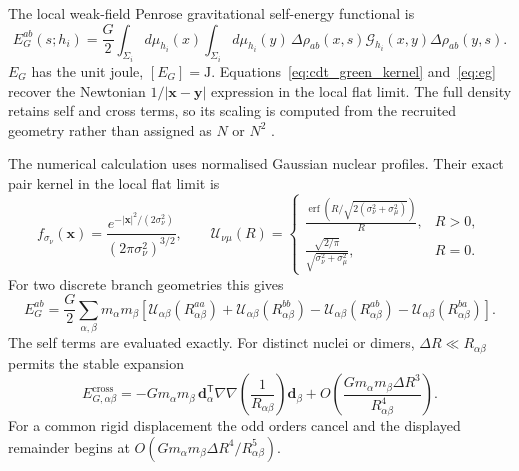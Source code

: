 The local weak-field Penrose gravitational self-energy functional is
\begin{equation}
  E_G^{ab}(s;h_i)=
  \frac{G}{2}
  \int_{\Sigma_i}d\mu_{h_i}(x)
  \int_{\Sigma_i}d\mu_{h_i}(y)\,
  \Delta\rho_{ab}(x,s)\mathcal G_{h_i}(x,y)\Delta\rho_{ab}(y,s).
  \label{eq:eg}
\end{equation}
\noindent $E_G$ has the unit joule, $[E_G]=\mathrm J$.
Equations~\eqref{eq:cdt_green_kernel}
and~\eqref{eq:eg} recover the Newtonian $1/|\mathbf x-\mathbf y|$ expression in the
local flat limit. The full density retains self and cross terms, so its scaling is
computed from the recruited geometry rather than assigned as $N$ or $N^2$
\citep{hameroff2014,figurato2024,tomaz2024}.

The numerical calculation uses normalised Gaussian nuclear profiles. Their exact
pair kernel in the local flat limit is
\begin{equation}
  f_{\sigma_\nu}(\mathbf x)=
  \frac{e^{-|\mathbf x|^2/(2\sigma_\nu^2)}}{(2\pi\sigma_\nu^2)^{3/2}},
  \qquad
  \mathcal U_{\nu\mu}(R)=
  \begin{cases}
    \displaystyle
    \frac{\operatorname{erf}\!\left(
      R/\sqrt{2(\sigma_\nu^2+\sigma_\mu^2)}
    \right)}{R}, & R>0,\\[1.0ex]
    \displaystyle
    \frac{\sqrt{2/\pi}}{\sqrt{\sigma_\nu^2+\sigma_\mu^2}}, & R=0.
  \end{cases}
  \label{eq:gaussian_mass_kernel}
\end{equation}
For two discrete branch geometries this gives
\begin{equation}
  E_G^{ab}=\frac{G}{2}\sum_{\alpha,\beta}m_\alpha m_\beta
  \left[
    \mathcal U_{\alpha\beta}(R_{\alpha\beta}^{aa})
    +\mathcal U_{\alpha\beta}(R_{\alpha\beta}^{bb})
    -\mathcal U_{\alpha\beta}(R_{\alpha\beta}^{ab})
    -\mathcal U_{\alpha\beta}(R_{\alpha\beta}^{ba})
  \right].
  \label{eq:geometric_eg_discrete}
\end{equation}
The self terms are evaluated exactly. For distinct nuclei or dimers,
$\Delta R\ll R_{\alpha\beta}$ permits the stable expansion
\begin{equation}
  E_{G,\alpha\beta}^{\mathrm{cross}}
  =-Gm_\alpha m_\beta\,
  \mathbf d_\alpha^{\mathsf T}
  \nabla\nabla\!\left(\frac{1}{R_{\alpha\beta}}\right)
  \mathbf d_\beta
  +O\!\left(\frac{Gm_\alpha m_\beta\Delta R^3}{R_{\alpha\beta}^4}\right).
  \label{eq:geometric_cross_expansion}
\end{equation}
For a common rigid displacement the odd orders cancel and the displayed remainder
begins at $O(Gm_\alpha m_\beta\Delta R^4/R_{\alpha\beta}^5)$.

